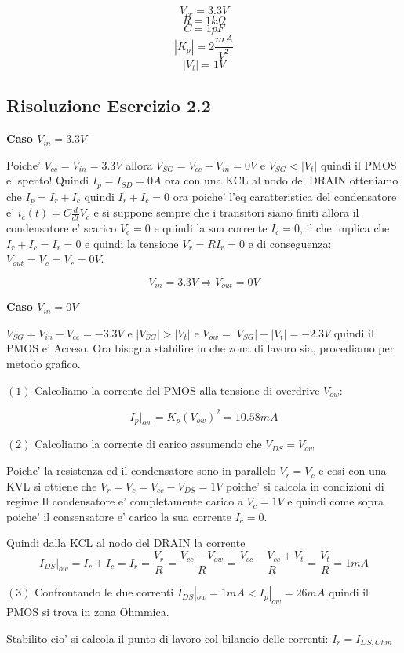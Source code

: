 \documentclass[\main/main.tex]{subfiles}
\begin{document}
\[V_{cc} = 3.3V\]
\[R = 1k\Omega\]
\[C = 1pF\]
\[|K_p| = 2 \frac{mA}{V^2}\]
\[|V_t| = 1V\]

\clearpage
\subsection{Risoluzione Esercizio 2.2}
\textbf{Caso $V_{in} = 3.3V$}

Poiche' $V_{cc} = V_{in} = 3.3V$ allora $V_{SG} = V_{cc} - V_{in} = 0V$ e
$V_{SG} < |V_t|$ quindi il PMOS e' spento! Quindi $I_p = I_{SD} = 0A$ ora con una KCL al nodo del DRAIN otteniamo che $I_p = I_r + I_c$ quindi $I_r + I_c = 0$ ora poiche' l'eq caratteristica del condensatore e' $i_c(t) = C \frac{d}{dt}V_c$ e si suppone sempre che i transitori siano finiti allora il condensatore e' scarico $V_c = 0$ e quindi la sua corrente $I_c = 0$, il che implica che $I_r + I_c = I_r = 0$ e quindi la tensione $V_r = R I_r = 0$ e di conseguenza: $V_{out} = V_c = V_r = 0V$.

\[V_{in} = 3.3V \Rightarrow V_{out} = 0V\]

\textbf{Caso $V_{in} = 0V$}

$V_{SG} = V_{in} - V_{cc} = -3.3V$ e $|V_{SG}| > |V_t|$ e $V_{ow} = |V_{SG}| - |V_t| = -2.3V$ quindi il PMOS e' Acceso.
Ora bisogna stabilire in che zona di lavoro sia, procediamo per metodo grafico.

$(1)$ Calcoliamo la corrente del PMOS alla tensione di overdrive $V_{ow}$:

\[I_p |_{ow} = K_p \left(V_{ow}\right)^2 = 10.58mA\]

$(2)$ Calcoliamo la corrente di carico assumendo che $V_{DS} = V_{ow}$

Poiche' la resistenza ed il condensatore sono in parallelo $V_r = V_c$ e cosi con una KVL si ottiene che $V_r = V_c = V_{cc} - V_{DS} = 1V$ poiche' si calcola in condizioni di regime Il condensatore e' completamente carico a $V_c = 1V$  e quindi come sopra poiche' il consensatore e' carico la sua corrente $I_c = 0$.

Quindi dalla KCL al nodo del DRAIN la corrente \[I_{DS}|_{ow} = I_r + I_c = I_r = \frac{V_r}{R}= \frac{ V_{cc} - V_{ow}}{R} =  \frac{ V_{cc} - V_{cc} + V_t}{R} = \frac{V_t}{R} = 1mA\]

$(3)$ Confrontando le due correnti $I_{DS}|_{ow} = 1mA < I_p |_{ow} = 26mA$ quindi il PMOS si trova in zona Ohmmica.


Stabilito cio' si calcola il punto di lavoro col bilancio delle correnti:
$I_r = I_{DS,Ohm}$
\end{document}
